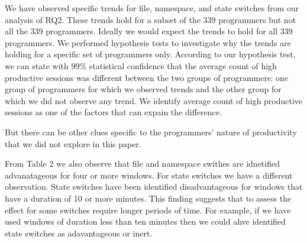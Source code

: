 \begin{itemize}
\begin{item}
We have observed specific trends for file, namespace, and state switches from our analysis of RQ2. These trends hold for a subset of the 339 programmers but not all the 339 programmers. Ideally we would expect the trends to hold for all 339 programmers. We performed hypothesis tests to investigate why the trends are holding for a specific set of programmers only. According to our hypothesis test, we can state with 99\% statistical confidence that the average count of high productive sessions was                        
different between the two groups of programmers: one group of programmers for which we observed trends and the other group for which we did not observe any trend. We identify average count of high productive sessions as one of the factors that can expain the difference. 

But there can be other clues specific to the programmers' nature of productivity that we did not explore in this paper.  
        
     
\end{item}


\begin{item}  

From Table 2 we also observe that file and namespace swithes are idnetified advanatageous for four or more windows. For state switches we have a different observation. State switches have been identified 
disadvantageous for windows that have a duration of 10 or more minutes. This finding suggests that to assess the effect for some switches require longer periods of time. For example, if we have used windows of duration less than ten minutes then we could ahve identified state switches as adavantageous or inert.    
        
     
\end{item}

\end{itemize}


